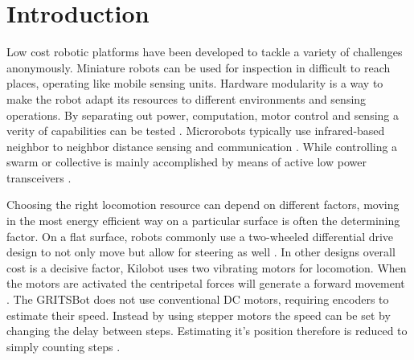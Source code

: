 \documentclass[../MainPaper.tex]{subfiles}
\begin{document}
\section{Introduction}



Low cost robotic platforms have been developed to tackle a variety of challenges anonymously.
Miniature robots can be used for inspection in difficult to reach places, operating like mobile sensing units.
Hardware modularity is a way to make the robot adapt its resources to different environments and sensing operations.
By separating out power, computation, motor control and sensing a verity of capabilities can be tested \cite{RN13, RN2}.
Microrobots typically use infrared-based neighbor to neighbor distance sensing and communication \cite{RN3}.
While controlling a swarm or collective is mainly accomplished by means of active low power transceivers \cite{RN13, RN2}. 


Choosing the right locomotion resource can depend on different factors, moving in the most energy efficient way on a particular surface is often the determining factor.
On a flat surface, robots commonly use a two-wheeled differential drive design to not only move but allow for steering as well \cite{RN13, RN2}. 
In other designs overall cost is a decisive factor, Kilobot uses two vibrating motors for locomotion.
When the motors are activated the centripetal forces will generate a forward movement \cite{RN3}.
The GRITSBot does not use conventional DC motors, requiring encoders to estimate their speed. 
Instead by using stepper motors the speed can be set by changing the delay between steps. 
Estimating it's position therefore is reduced to simply counting steps \cite{RN2}. 

\end{document}
